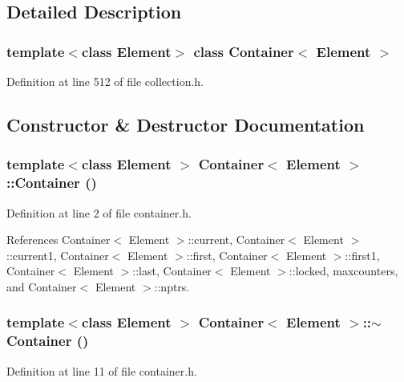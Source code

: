 \subsection{Detailed Description}
\subsubsection*{template$<$class Element$>$ class Container$<$ Element $>$}



Definition at line 512 of file collection.h.

\subsection{Constructor \& Destructor Documentation}
\hypertarget{classContainer_ac3acb1abebc929f273ef5bfad58663d}{
\subsubsection[{Container}]{\setlength{\rightskip}{0pt plus 5cm}template$<$class Element $>$ {\bf Container}$<$ Element $>$::{\bf Container} ()}}
\label{classContainer_ac3acb1abebc929f273ef5bfad58663d}




Definition at line 2 of file container.h.

References Container$<$ Element $>$::current, Container$<$ Element $>$::current1, Container$<$ Element $>$::first, Container$<$ Element $>$::first1, Container$<$ Element $>$::last, Container$<$ Element $>$::locked, maxcounters, and Container$<$ Element $>$::nptrs.\hypertarget{classContainer_378faacef1170f23344e63eedb3b6c10}{
\subsubsection[{$\sim$Container}]{\setlength{\rightskip}{0pt plus 5cm}template$<$class Element $>$ {\bf Container}$<$ Element $>$::$\sim${\bf Container} ()}}
\label{classContainer_378faacef1170f23344e63eedb3b6c10}




Definition at line 11 of file container.h.

